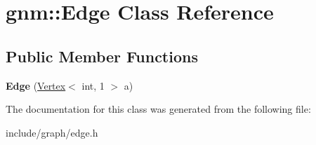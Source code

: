 \hypertarget{classgnm_1_1_edge}{}\section{gnm\+:\+:Edge Class Reference}
\label{classgnm_1_1_edge}
\subsection*{Public Member Functions}
\begin{DoxyCompactItemize}
\item 
{\bfseries Edge} (\hyperlink{classgnm_1_1_vertex}{Vertex}$<$ int, 1 $>$ a)\hypertarget{classgnm_1_1_edge_af9b768b04991857670c35254e4b03988}{}\label{classgnm_1_1_edge_af9b768b04991857670c35254e4b03988}

\end{DoxyCompactItemize}


The documentation for this class was generated from the following file\+:\begin{DoxyCompactItemize}
\item 
include/graph/edge.\+h\end{DoxyCompactItemize}
